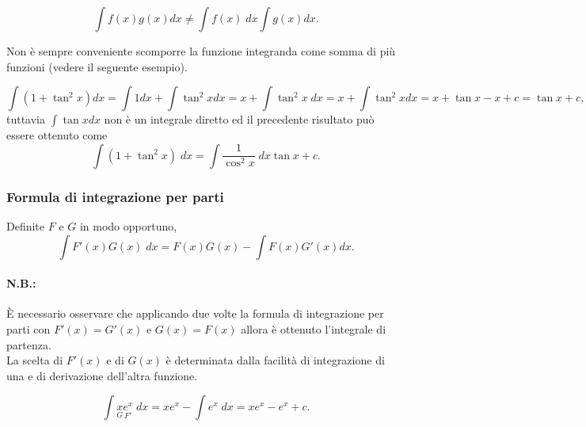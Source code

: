 \begin{property}
    \begin{equation*}
        \int f(x)g(x)dx\neq\int f(x) \; dx\int g(x)dx.
    \end{equation*}
\end{property}

Non è sempre conveniente scomporre la funzione integranda come somma di più funzioni (vedere il seguente esempio).
\begin{example}
    \begin{equation*}
        \int(1+\tan^2x)dx=\int 1dx+\int\tan^2xdx = x+\int\tan^2x \; dx= x + \int\tan^2 xdx=x+\tan x-x+c=\tan x+c,
    \end{equation*}
    tuttavia $\int\tan xdx$ non è un integrale diretto ed il precedente risultato può essere ottenuto come
    \begin{equation*}
        \int(1 + \tan^2x) \; dx = \int \frac{1}{\cos^2x} \; dx\tan x + c.
    \end{equation*}
\end{example}

\subsubsection{Formula di integrazione per parti}
\begin{definition}
    Definite $F$ e $G$ in modo opportuno,
    \begin{equation}\label{eq:formula_integrazione_parti}
        \int  F'(x)G(x) \; dx=F(x)G(x) - \int F(x)G'(x)dx.
    \end{equation}
\end{definition}

\paragraph{N.B.:} È necessario osservare che applicando due volte la formula di integrazione per parti con $F'(x)=G'(x)$ e $G(x)=F(x)$ allora è ottenuto l'integrale di partenza.\\
La scelta di $F'(x)$ e di $G(x)$ è determinata dalla facilità di integrazione di una e di derivazione dell'altra funzione.

\begin{example}
    \begin{equation*}
        \int \underset{G}{x} \underset{F'}{e^x} \; dx = xe^x - \int e^x \; dx=xe^x -e^x + c.
    \end{equation*}
\end{example}

